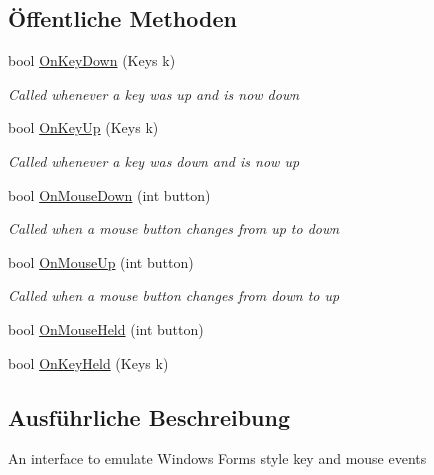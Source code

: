\subsection*{Öffentliche Methoden}
\begin{DoxyCompactItemize}
\item 
bool \hyperlink{interface_gruppe22_1_1_client_1_1_i_key_handler_a3816611e429cab857650f672fda4632b}{On\-Key\-Down} (Keys k)
\begin{DoxyCompactList}\small\item\em Called whenever a key was up and is now down \end{DoxyCompactList}\item 
bool \hyperlink{interface_gruppe22_1_1_client_1_1_i_key_handler_adf473af0ebd0c8a3a22ba252ed381356}{On\-Key\-Up} (Keys k)
\begin{DoxyCompactList}\small\item\em Called whenever a key was down and is now up \end{DoxyCompactList}\item 
bool \hyperlink{interface_gruppe22_1_1_client_1_1_i_key_handler_a6e52139cdd4408abdd31e61ce1e69991}{On\-Mouse\-Down} (int button)
\begin{DoxyCompactList}\small\item\em Called when a mouse button changes from up to down \end{DoxyCompactList}\item 
bool \hyperlink{interface_gruppe22_1_1_client_1_1_i_key_handler_ad1fd9aa17fc6f8328beddd59cef28499}{On\-Mouse\-Up} (int button)
\begin{DoxyCompactList}\small\item\em Called when a mouse button changes from down to up \end{DoxyCompactList}\item 
bool \hyperlink{interface_gruppe22_1_1_client_1_1_i_key_handler_aa66a6080c4ea14b63a5578882b9f3b3e}{On\-Mouse\-Held} (int button)
\item 
bool \hyperlink{interface_gruppe22_1_1_client_1_1_i_key_handler_a4196bd333be759f8ade7996f58ca39d6}{On\-Key\-Held} (Keys k)
\end{DoxyCompactItemize}


\subsection{Ausführliche Beschreibung}
An interface to emulate Windows Forms style key and mouse events 



